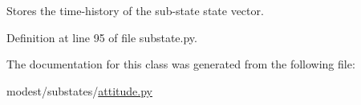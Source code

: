 Stores the time-\/history of the sub-\/state state vector. 



Definition at line 95 of file substate.\+py.



The documentation for this class was generated from the following file\+:\begin{DoxyCompactItemize}
\item 
modest/substates/\hyperlink{attitude_8py}{attitude.\+py}\end{DoxyCompactItemize}
